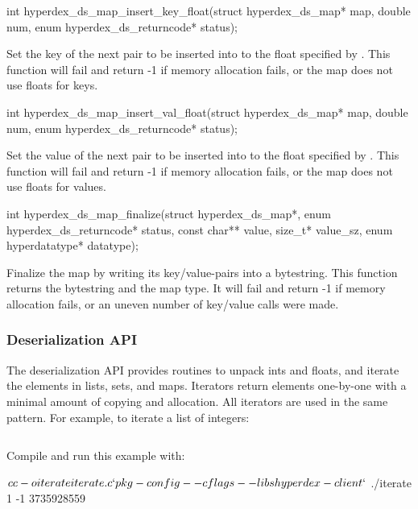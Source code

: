 \begin{ccode}
int hyperdex_ds_map_insert_key_float(struct hyperdex_ds_map* map,
                                     double num,
                                     enum hyperdex_ds_returncode* status);
\end{ccode}
Set the key of the next pair to be inserted into  to the
float specified by .  This function will fail and return -1 if memory
allocation fails, or the map does not use floats for keys.

\begin{ccode}
int hyperdex_ds_map_insert_val_float(struct hyperdex_ds_map* map,
                                     double num,
                                     enum hyperdex_ds_returncode* status);
\end{ccode}
Set the value of the next pair to be inserted into  to the
float specified by .  This function will fail and return -1 if memory
allocation fails, or the map does not use floats for values.

\begin{ccode}
int hyperdex_ds_map_finalize(struct hyperdex_ds_map*,
                             enum hyperdex_ds_returncode* status,
                             const char** value, size_t* value_sz,
                             enum hyperdatatype* datatype);
\end{ccode}
Finalize the map by writing its key/value-pairs  into a bytestring.
This function returns the bytestring and the map type.  It will fail and return
-1 if memory allocation fails, or an uneven number of key/value calls were made.

\subsubsection{Deserialization API}
\label{sec:api:c:client:deserialize}

The deserialization API provides routines to unpack ints and floats, and iterate
the elements in lists, sets, and maps.  Iterators return elements one-by-one
with a minimal amount of copying and allocation.  All iterators are used in the
same pattern.  For example, to iterate a list of integers:

\inputminted{c}{\topdir/api/c/iterate.c}

Compile and run this example with:

\begin{consolecode}
$ cc -o iterate iterate.c `pkg-config --cflags --libs hyperdex-client`
$ ./iterate
1
-1
3735928559
\end{consolecode}

